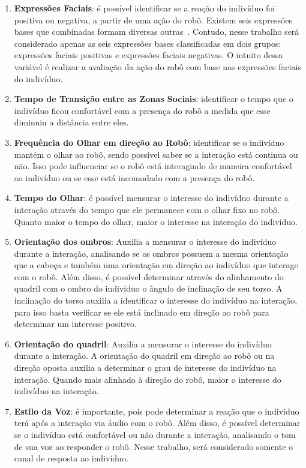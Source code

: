 \begin{enumerate}
	\item \textbf{Expressões Faciais}: é possível identificar se a reação do indivíduo foi positiva ou negativa, a partir de uma ação do robô. Existem seis expressões bases que combinadas formam diversas outras~\cite{bihan:2014}. Contudo, nesse trabalho será considerado apenas as seis expressões bases classificadas em dois grupos: expressões faciais positivas e expressões faciais negativas. O intuito dessa variável é realizar a avaliação da ação do robô com base nas expressões faciais do indivíduo.
	\item \textbf{Tempo de Transição entre as Zonas Sociais}: identificar o tempo que o indivíduo ficou confortável com a presença do robô a medida que esse diminuiu a distância entre eles.
	\item \textbf{Frequência do Olhar em direção ao Robô}: identificar se o indivíduo mantém o olhar ao robô, sendo possível saber se a interação está continua ou não. Isso pode influenciar se o robô está interagindo de maneira confortável ao indivíduo ou se esse está incomodado com a presença do robô.
	\item \textbf{Tempo do Olhar}: é possível mensurar o interesse do indivíduo durante a interação através do tempo que ele permanece com o olhar fixo no robô. Quanto maior o tempo do olhar, maior o interesse na interação do indivíduo.
	\item \textbf{Orientação dos ombros}: Auxilia a mensurar o interesse do indivíduo durante a interação, analisando se os ombros possuem a mesma orientação que a cabeça e também uma orientação em direção ao indivíduo que interage com o robô. Além disso, é possível determinar através do alinhamento do quadril com o ombro do indivíduo o ângulo de inclinação de seu torso. A inclinação do torso auxilia a identificar o interesse do indivíduo na interação, para isso basta verificar se ele está inclinado em direção ao robô para determinar um interesse positivo.
	\item \textbf{Orientação do quadril}: Auxilia a mensurar o interesse do indivíduo durante a interação. A orientação do quadril em direção ao robô ou na direção oposta auxilia a determinar o grau de interesse do indivíduo na interação. Quando mais alinhado à direção do robô, maior o interesse do indivíduo na interação.
	\item \textbf{Estilo da Voz}: é importante, pois pode determinar a reação que o indivíduo terá após a interação via áudio com o robô. Além disso, é possível determinar se o indivíduo está confortável ou não durante a interação, analisando o tom de sua voz ao responder o robô. Nesse trabalho, será considerado somente o canal de resposta ao indivíduo.
\end{enumerate}

